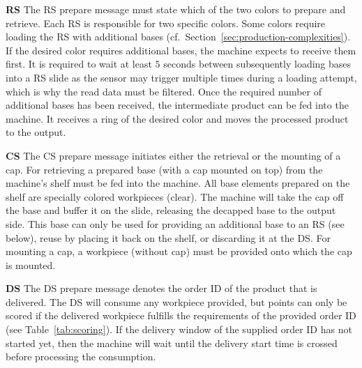 \documentclass[12pt,twoside]{article}
\newcommand{\refsec}[1]{Section~\ref{#1}}
\newcommand{\reftab}[1]{Table~\ref{#1}}
\begin{document}
\noindent\textbf{\acl{RS}}
The \ac{RS} prepare message must state which of the two colors to prepare and
retrieve. Each \ac{RS} is responsible for two specific colors. Some colors
require loading the \ac{RS} with additional bases
(cf.~\refsec{sec:production-complexities}). If the desired color requires
additional bases, the machine expects to receive them first.
It is required to wait at least $5$ seconds between
subsequently loading bases into a \ac{RS} slide as the sensor may trigger
multiple times during a loading attempt, which is why the read data must be
filtered.
Once the required number of
additional bases has been received, the intermediate product can be
fed into the machine. It receives a ring of the desired color and
moves the processed product to the output.

\noindent\textbf{\acl{CS}}
The \ac{CS} prepare message initiates either the retrieval or the mounting of
a cap. For retrieving a prepared base (with a cap mounted on top) from
the machine's shelf must be fed into the machine. All base elements
prepared on the shelf are specially colored workpieces (clear). The
machine will take the cap off the base and buffer it on the slide,
releasing the decapped base to the output side. This base can only be
used for providing an additional base to an \ac{RS} (see below), reuse by
placing it back on the shelf, or discarding it at the \ac{DS}.  For
mounting a cap, a workpiece (without cap) must be provided onto which
the cap is mounted.

\noindent\textbf{\acl{DS}}
The \ac{DS} prepare message denotes the order ID of the product
that is delivered.
The \ac{DS} will consume any workpiece provided,
but points can only be scored if the delivered workpiece fulfills the
requirements of the provided order ID (see \reftab{tab:scoring}).
If the delivery window of the supplied order ID has not started yet, then the
machine will wait until the delivery start time is crossed before processing
the consumption.
\end{document}
